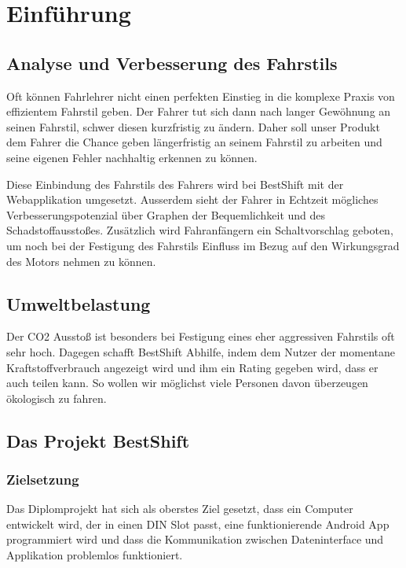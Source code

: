 \chapter{Einführung}

\section{Analyse und Verbesserung des Fahrstils}
Oft können Fahrlehrer nicht einen perfekten Einstieg in die komplexe Praxis von effizientem Fahrstil geben. Der Fahrer tut sich dann nach langer Gewöhnung an seinen Fahrstil, schwer diesen kurzfristig zu ändern. Daher soll unser Produkt dem Fahrer die Chance geben längerfristig an seinem Fahrstil zu arbeiten und seine eigenen Fehler nachhaltig erkennen zu können.

\newline
Diese Einbindung des Fahrstils des Fahrers wird bei BestShift mit der Webapplikation umgesetzt. Ausserdem sieht der Fahrer in Echtzeit mögliches Verbesserungspotenzial über Graphen der Bequemlichkeit und des Schadstoffausstoßes. Zusätzlich wird Fahranfängern ein Schaltvorschlag geboten, um noch bei der Festigung des Fahrstils Einfluss im Bezug auf den Wirkungsgrad des Motors nehmen zu können.

\newline
\section{Umweltbelastung}
Der CO2 Ausstoß ist besonders bei Festigung eines eher aggressiven Fahrstils oft sehr hoch. Dagegen schafft BestShift Abhilfe, indem dem Nutzer der momentane Kraftstoffverbrauch angezeigt wird und ihm ein Rating gegeben wird, dass er auch teilen kann. So wollen wir möglichst viele Personen davon überzeugen ökologisch zu fahren. 

\section{Das Projekt BestShift}
\subsection{Zielsetzung}
Das Diplomprojekt hat sich als oberstes Ziel gesetzt, dass ein Computer entwickelt wird, der in einen DIN Slot passt, eine funktionierende Android App programmiert wird und dass die Kommunikation zwischen Dateninterface und Applikation problemlos funktioniert.
